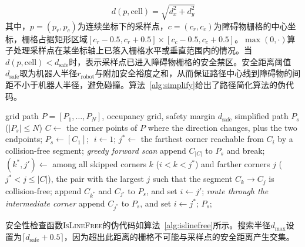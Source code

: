 \documentclass[lettersize,journal]{IEEEtran}
\begin{document}
\begin{equation}
d(p, \mathrm{cell}) = \sqrt{d_x^2 + d_y^2}
\label{eq:dist}
\end{equation}
其中，$p = (p_r, p_c)$为连续坐标下的采样点，$c = (c_r, c_c)$为障碍物栅格的中心坐标，栅格占据矩形区域$[c_r - 0.5, c_r + 0.5] \times [c_c - 0.5, c_c + 0.5]$。$\max(0, \cdot)$算子处理采样点在某坐标轴上已落入栅格水平或垂直范围内的情况。当$d(p, \mathrm{cell}) < d_{\mathrm{safe}}$时，表示采样点已进入障碍物栅格的安全禁区。安全距离阈值$d_{\mathrm{safe}}$取为机器人半径$r_{\mathrm{robot}}$与附加安全裕度之和，从而保证路径中心线到障碍物的间距不小于机器人半径，避免碰撞。算法~\textcolor{blue}{\ref{alg:simplify}}给出了路径简化算法的伪代码。
\begin{algorithm}[!t]
\caption{Safety-distance-aware path simplification}
\label{alg:simplify}
\begin{algorithmic}[1]
\REQUIRE grid path $P = [P_1, \ldots, P_N]$, occupancy grid, safety margin $d_{\mathrm{safe}}$
\ENSURE simplified path $P_s$ ($|P_s| \leq N$)
\STATE $C \gets$ the corner points of $P$ where the direction changes, plus the two endpoints;
\STATE $P_s \gets [C_1]$; $\; i \gets 1$;
\STATE $j^{*} \gets$ the farthest corner reachable from $C_i$ by a collision-free segment; \quad\textit{greedy forward scan}
\STATE append $C_{|C|}$ to $P_s$ and break;
\ENDIF
\STATE $(k^{*}, j') \gets$ among all skipped corners $k$ ($i < k < j^{*}$) and farther corners $j$ ($j^{*} < j \leq |C|$), the pair with the largest $j$ such that the segment $C_k \to C_j$ is collision-free;
\STATE append $C_{k^{*}}$ and $C_{j'}$ to $P_s$, and set $i \gets j'$; \quad\textit{route through the intermediate corner}
\ELSE
\STATE append $C_{j^{*}}$ to $P_s$, and set $i \gets j^{*}$;
\ENDIF
\ENDWHILE
\STATE \RETURN $P_s$;
\end{algorithmic}
\end{algorithm}
安全性检查函数\textsc{IsLineFree}的伪代码如算法~\textcolor{blue}{\ref{alg:islinefree}}所示。搜索半径$d_{\max}$设置为$\lceil d_{\mathrm{safe}} + 0.5 \rceil$，因为超出此距离的栅格不可能与采样点的安全距离产生交集。
\end{document}
